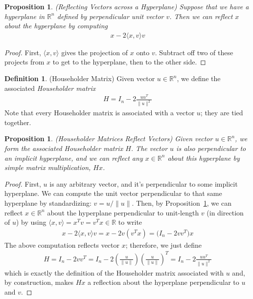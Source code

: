 \documentclass[12pt]{article}
\numberwithin{equation}{section} %
\theoremstyle{plain}
\newtheorem{prop}[thm]{Proposition}
\theoremstyle{definition}
\newtheorem{defn}[thm]{Definition}
\theoremstyle{remark}
\newcommand{\R}{\mathbb{R}}
\newcommand{\Rn}{\mathbb{R}^n}
\begin{document}
\begin{prop}\emph{(Reflecting Vectors across a Hyperplane)}
\label{prop:reflect}
Suppose that we have a hyperplane in $\Rn$ defined by perpendicular
unit vector $v$. Then we can reflect $x$ about the hyperplane by
computing
\begin{align*}
  x - 2\langle x,v\rangle v
\end{align*}
\end{prop}
\begin{proof}
First, $\langle x,v\rangle$ gives the projection of $x$ onto $v$.
Subtract off two of these projects from $x$ to get to the hyperplane,
then to the other side.
\end{proof}

\begin{defn}(Householder Matrix)
Given vector $u\in\R^n$, we define the associated
\emph{Householder matrix}
\begin{align*}
  H = I_n - 2\frac{uu^T}{\lVert u\rVert^2}
\end{align*}
Note that every Householder matrix is associated with a vector $u$; they
are tied together.
\end{defn}

\begin{prop}\emph{(Householder Matrices Reflect Vectors)}
Given vector $u\in\Rn$, we form the associated Householder matrix $H$.
The vector $u$ is also perpendicular to an implicit hyperplane, and
we can reflect any $x\in\Rn$ about this hyperplane by simple matrix
multiplication, $Hx$.
\end{prop}
\begin{proof}
First, $u$ is any arbitrary vector, and it's perpendicular to some
implicit hyperplane. We can compute the unit vector perpendicular to
that same hyperplane by standardizing: $v=u/\lVert u\rVert$.
Then, by Proposition~\ref{prop:reflect}, we can reflect $x\in\Rn$ about
the hyperplane perpendicular to unit-length $v$ (in direction of $u$) by
using $\langle x,v\rangle=x^Tv=v^Tx\in\R$ to write
\begin{align*}
  x - 2\langle x,v\rangle v
  =
  x - 2 v(v^Tx)
  =
  \big( I_n - 2 vv^T\big)x
\end{align*}
The above computation reflects vector $x$; therefore, we just define
\begin{align*}
  H
  = I_n - 2 vv^T
  = I_n
  - 2 \left(\frac{u}{\lVert u\rVert}\right)
  \left(\frac{u}{\lVert u\rVert}\right)^T
  = I_n - 2 \frac{uu^T}{\lVert u\rVert^2}
\end{align*}
which is exactly the definition of the Householder matrix associated
with $u$ and, by construction, makes $Hx$ a reflection about the
hyperplane perpendicular to $u$ and $v$.
\end{proof}
\end{document}
